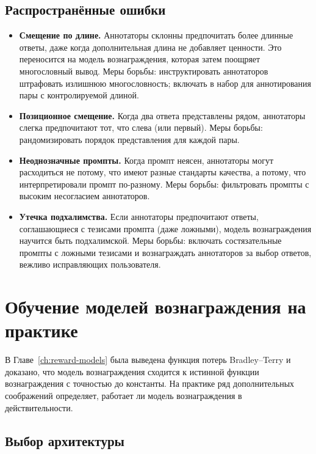 \subsection{Распространённые ошибки}

\begin{itemize}[leftmargin=*]
  \item \textbf{Смещение по длине.} Аннотаторы склонны предпочитать более длинные ответы, даже когда дополнительная длина не добавляет ценности. Это переносится на модель вознаграждения, которая затем поощряет многословный вывод. Меры борьбы: инструктировать аннотаторов штрафовать излишнюю многословность; включать в набор для аннотирования пары с контролируемой длиной.
  \item \textbf{Позиционное смещение.} Когда два ответа представлены рядом, аннотаторы слегка предпочитают тот, что слева (или первый). Меры борьбы: рандомизировать порядок представления для каждой пары.
  \item \textbf{Неоднозначные промпты.} Когда промпт неясен, аннотаторы могут расходиться не потому, что имеют разные стандарты качества, а потому, что интерпретировали промпт по-разному. Меры борьбы: фильтровать промпты с высоким несогласием аннотаторов.
  \item \textbf{Утечка подхалимства.} Если аннотаторы предпочитают ответы, соглашающиеся с тезисами промпта (даже ложными), модель вознаграждения научится быть подхалимской. Меры борьбы: включать состязательные промпты с ложными тезисами и вознаграждать аннотаторов за выбор ответов, вежливо исправляющих пользователя.
\end{itemize}

\section{Обучение моделей вознаграждения на практике}
\label{sec:rm-practice}

В Главе~\ref{ch:reward-models} была выведена функция потерь Bradley--Terry и доказано, что модель вознаграждения сходится к истинной функции вознаграждения с точностью до константы. На практике ряд дополнительных соображений определяет, работает ли модель вознаграждения в действительности.

\subsection{Выбор архитектуры}

